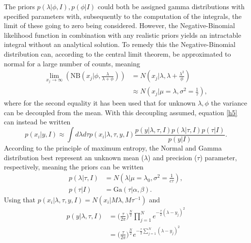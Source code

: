 The priors $p(\lambda|\phi,I), p(\phi|I)$ could both be assigned gamma distributions with specified parameters with, subsequently to the computation of the integrals, the limit of these going to zero being considered. However, the Negative-Binomial likelihood function in combination with any realistic priors yields an intractable integral without an analytical solution. To remedy this the Negative-Binomial distribution can, according to the central limit theorem, be approximated to normal for a large number of counts, meaning
\begin{equation}
	\begin{split}
		\lim\limits_{x_j\rightarrow \infty}(\text{NB}(x_j|\phi,\frac{\lambda}{\lambda+\phi})) &=N(x_j|\lambda,\lambda+\frac{\lambda^2}{\phi})\\
		&\approx N(x_j|\mu = \lambda,\sigma^2=\frac{1}{\tau}),
	\end{split}
\end{equation}
where for the second equality it has been used that for unknown $\lambda,\phi$ the variance can be decoupled from the mean. With this decoupling assumed, equation \eqref{h5} can instead be written
\begin{equation}
	p(x_i|y,I) \approx \int d\lambda d\tau p(x_i|\lambda,\tau,y,I)\frac{p(y|\lambda,\tau,I)p(\lambda|\tau,I)p(\tau|I)}{p(y|I)}.
	\label{h6}
\end{equation}
According to the principle of maximum entropy, the Normal and Gamma distribution best represent an unknown mean ($\lambda$) and precision ($\tau$) parameter, respectively, meaning the priors can be written
\begin{equation}
	\begin{split}
		p(\lambda|\tau,I) &=N(\lambda|\mu=\lambda_0,\sigma^2=\frac{1}{c\tau}),\\
		p(\tau|I)&= \text{Ga}(\tau|\alpha,\beta).
	\end{split}
\end{equation}
Using that $p(x_i|\lambda,\tau,y,I)=N(x_i|M\lambda,M\tau^{-1})$ and
\begin{equation}
	\begin{split}
		p(y|\lambda,\tau,I) &= \bigg(\frac{\tau}{2\pi}\bigg)^{\frac{N}{2}}\prod_{j=1}^{N}e^{-\frac{\tau}{2}(\lambda-y_j)^2}\\
		&=\bigg(\frac{\tau}{2\pi}\bigg)^{\frac{N}{2}}e^{-\frac{\tau}{2}\sum_{j=1}^{N}(\lambda-y_j)^2}\\
	\end{split}
\end{equation}
